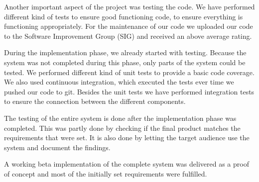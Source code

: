 Another important aspect of the project was testing the code.
We have performed different kind of tests to ensure good functioning code, to ensure everything is functioning appropriately.
For the maintenance of our code we uploaded our code to the Software Improvement Group (SIG) and received an above average rating.

During the implementation phase, we already started with testing. 
Because the system was not completed during this phase, only parts of the system could be tested.
We performed different kind of unit tests to provide a basic code coverage.
We also used continuous integration, which executed the tests ever time we pushed our code to git.
Besides the unit tests we have performed integration tests to ensure the connection between the different components.

The testing of the entire system is done after the implementation phase was completed. 
This was partly done by checking if the final product matches the requirements that were set. 
It is also done by letting the target audience use the system and document the findings.

A working beta implementation of the complete system was delivered as a proof of concept and most of the initially set requirements were fulfilled.
